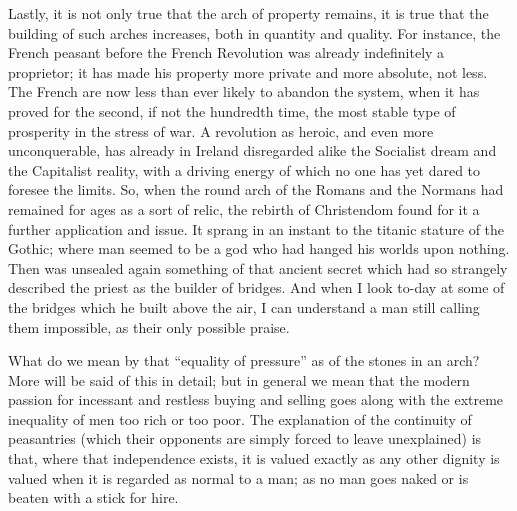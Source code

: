 \documentclass{book}
\begin{document}
Lastly, it is not only true that the arch of property remains, it is true that the building of such arches increases, both in quantity and quality. For instance, the French peasant before the French Revolution was already indefinitely a proprietor; it has made his property more private and more absolute, not less. The French are now less than ever likely to abandon the system, when it has proved for the second, if not the hundredth time, the most stable type of prosperity in the stress of war. A revolution as heroic, and even more unconquerable, has already in Ireland disregarded alike the Socialist dream and the Capitalist reality, with a driving energy of which no one has yet dared to foresee the limits. So, when the round arch of the Romans and the Normans had remained for ages as a sort of relic, the rebirth of Christendom found for it a further application and issue. It sprang in an instant to the titanic stature of the Gothic; where man seemed to be a god who had hanged his worlds upon nothing. Then was unsealed again something of that ancient secret which had so strangely described the priest as the builder of bridges. And when I look to-day at some of the bridges which he built above the air, I can understand a man still calling them impossible, as their only possible praise.

What do we mean by that “equality of pressure” as of the stones in an arch? More will be said of this in detail; but in general we mean that the modern passion for incessant and restless buying and selling goes along with the extreme inequality of men too rich or too poor. The explanation of the continuity of peasantries (which their opponents are simply forced to leave unexplained) is that, where that independence exists, it is valued exactly as any other dignity is valued when it is regarded as normal to a man; as no man goes naked or is beaten with a stick for hire.
\end{document}
